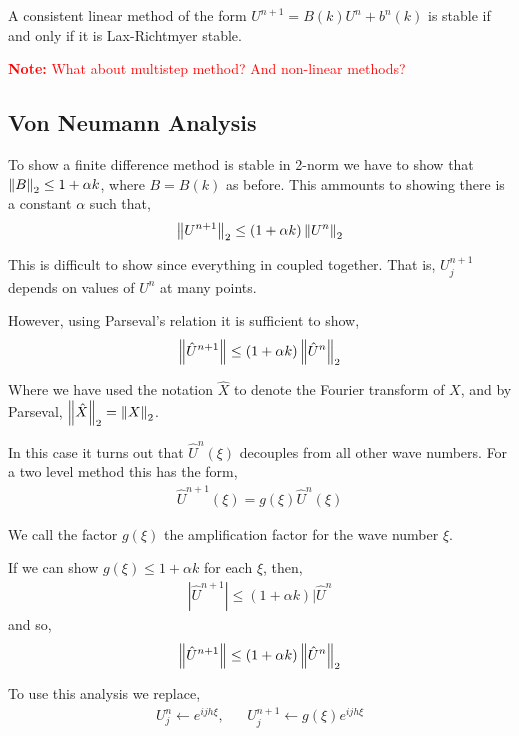 \documentclass[12pt]{article}
\newcommand{\note}[1]{\textcolor{red}{\textbf{Note:} #1}}
\begin{document}
\begin{theorem}
    A consistent linear method of the form \( U^{n+1} = B(k)U^n + b^n(k) \) is stable if and only if it is Lax-Richtmyer stable.
\end{theorem}

\note{What about multistep method? And non-linear methods?}

\subsection{Von Neumann Analysis}
To show a finite difference method is stable in 2-norm we have to show that \( \left\lVert B\right\rVert_2 \leq 1+ \alpha k \), where \( B = B(k) \) as before. This ammounts to showing there is a constant \( \alpha \) such that,
\begin{align*}
    \left\lVert U^{n+1}\right\rVert_2 \leq (1+\alpha k) \left\lVert U^n\right\rVert_2
\end{align*}

This is difficult to show since everything in coupled together. That is, \( U_j^{n+1} \) depends on values of \( U^n \) at many points.

However, using Parseval's relation it is sufficient to show,
\begin{align*}
    \left\lVert\hat{U}^{n+1}\right\rVert \leq (1+\alpha k) \left\lVert\hat{U}^n\right\rVert_2
\end{align*}

Where we have used the notation \( \hat{X} \) to denote the Fourier transform of \( X \), and by Parseval, \( \left\lVert\hat{X}\right\rVert_2 = \left\lVert X\right\rVert_2 \).

In this case it turns out that \( \hat{U}^n(\xi) \) decouples from all other wave numbers. For a two level method this has the form,
\begin{align*}
    \hat{U}^{n+1}(\xi) = g(\xi) \hat{U}^n(\xi)
\end{align*}

We call the factor \( g(\xi) \) the amplification factor for the wave number \( \xi \).

If we can show \( g(\xi) \leq 1+\alpha k \) for each \( \xi \), then,
\begin{align*}
    |\hat{U}^{n+1}| \leq (1+\alpha k) |\hat{U}^n
\end{align*}
and so,
\begin{align*}
    \left\lVert\hat{U}^{n+1}\right\rVert \leq (1+\alpha k) \left\lVert\hat{U}^n\right\rVert_2
\end{align*}

To use this analysis we replace,
\begin{align*}
    U_j^n \leftarrow e^{ijh\xi}, && U_j^{n+1} \leftarrow g(\xi) e^{ijh\xi}
\end{align*}
\end{document}
